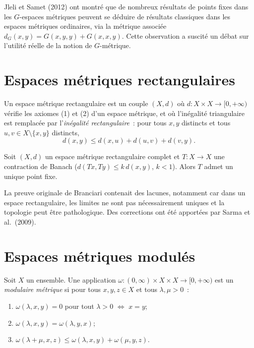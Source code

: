 \begin{remarque}
Jleli et Samet (2012) ont montr\'e que de nombreux r\'esultats de points fixes
dans les $G$-espaces m\'etriques peuvent se d\'eduire de r\'esultats classiques
dans les espaces m\'etriques ordinaires, via la m\'etrique associ\'ee
$d_G(x, y) = G(x, y, y) + G(x, x, y)$. Cette observation a suscit\'e un
d\'ebat sur l'utilit\'e r\'eelle de la notion de $G$-m\'etrique.
\end{remarque}

\section{Espaces m\'etriques rectangulaires}

\begin{definition}
Un espace m\'etrique rectangulaire est un couple $(X, d)$ o\`u
$d : X \times X \to [0, +\infty)$ v\'erifie les axiomes (1) et (2) d'un
espace m\'etrique, et o\`u l'in\'egalit\'e triangulaire est remplac\'ee par
l'\emph{in\'egalit\'e rectangulaire}~: pour tous $x, y$ distincts et tous
$u, v \in X \setminus \{x, y\}$ distincts,
\[
    d(x, y) \leq d(x, u) + d(u, v) + d(v, y).
\]
\end{definition}

\begin{theoreme}[Branciari, 2000]
Soit $(X, d)$ un espace m\'etrique rectangulaire complet et $T : X \to X$ une
contraction de Banach ($d(Tx, Ty) \leq k \, d(x,y)$, $k < 1$). Alors $T$ admet
un unique point fixe.
\end{theoreme}

\begin{attention}[title=\textbf{Subtilit\'es}]
La preuve originale de Branciari contenait des lacunes, notamment car dans un
espace rectangulaire, les limites ne sont pas n\'ecessairement uniques et la
topologie peut \^etre pathologique. Des corrections ont \'et\'e apport\'ees
par Sarma et al.\ (2009).
\end{attention}

\section{Espaces m\'etriques modul\'es}

\begin{definition}
Soit $X$ un ensemble. Une application $\omega : (0, \infty) \times X \times X \to [0, +\infty)$
est un \emph{modulaire m\'etrique} si pour tous $x, y, z \in X$ et tous
$\lambda, \mu > 0$~:
\begin{enumerate}
    \item $\omega(\lambda, x, y) = 0$ pour tout $\lambda > 0$ $\Leftrightarrow$ $x = y$;
    \item $\omega(\lambda, x, y) = \omega(\lambda, y, x)$;
    \item $\omega(\lambda + \mu, x, z) \leq \omega(\lambda, x, y) + \omega(\mu, y, z)$.
\end{enumerate}
\end{definition}

